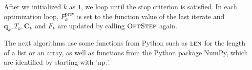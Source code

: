 After we initialized $k$ as $1$, we loop until the stop criterion is satisfied. In each optimization loop, $F^\mathrm{prev}_{k}$ is set to the function value of the last iterate and $\mathbf{q}_k,T_k,\mathbf{C}_k$ and $F_k$ are updated by calling $\textproc{OptStep}$ again.

The next algorithms use some functions from Python such as $\textproc{len}$ for the length of a list or an array, as well as functions from the Python package NumPy, which are identified by starting with '$\mathrm{np.}$'.

